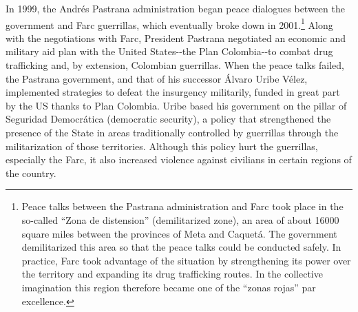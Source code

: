 \documentclass[
  11pt,
,
onecolumn,
openany
]{book}
\begin{document}
In 1999, the Andrés Pastrana administration began peace dialogues between the
government and Farc guerrillas, which eventually broke down in
2001.\footnote{Peace talks between the Pastrana administration and Farc took
  place in the so-called ``Zona de distension'' (demilitarized zone), an area
  of about 16000 square miles between the provinces of Meta and Caquetá. The
  government demilitarized this area so that the peace talks could be
  conducted safely. In practice, Farc took advantage of the situation by
  strengthening its power over the territory and expanding its drug
  trafficking routes. In the collective imagination this region therefore
  became one of the ``zonas rojas'' par excellence.} Along with the
negotiations with Farc, President Pastrana negotiated an economic and military
aid plan with the United States-\/-the Plan Colombia-\/-to combat drug
trafficking and, by extension, Colombian guerrillas. When the peace talks
failed, the Pastrana government, and that of his successor Álvaro Uribe Vélez,
implemented strategies to defeat the insurgency militarily, funded in great
part by the US thanks to Plan Colombia. Uribe based his government on the
pillar of Seguridad Democrática (democratic security), a policy that
strengthened the presence of the State in areas traditionally controlled by
guerrillas through the militarization of those territories. Although this
policy hurt the guerrillas, especially the Farc, it also increased violence
against civilians in certain regions of the country.
\end{document}
